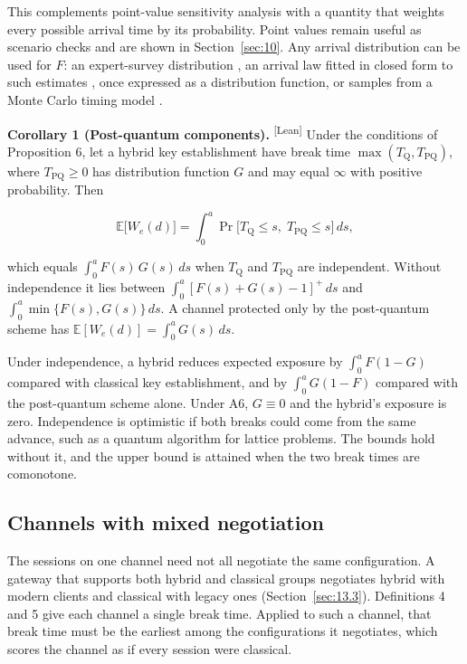 \documentclass[conference]{IEEEtran}
\newcommand{\Tq}{T_{\mathrm{Q}}}
\providecommand{\E}{}\renewcommand{\E}{\mathbb{E}}
\newcommand{\pos}[1]{\left[#1\right]^{+}}
\newcommand{\leantag}{\textsuperscript{\textsf{\scriptsize[Lean]}}}
\newenvironment{envblock}{\par\smallskip\noindent\ignorespaces}{\par\smallskip}
\begin{document}
This complements point-value sensitivity analysis with a quantity that weights every possible arrival time by its probability. Point values remain useful as scenario checks and are shown in Section~\ref{sec:10}. Any arrival distribution can be used for $F$: an expert-survey distribution \cite{mosca}, an arrival law fitted in closed form to such estimates \cite{shaw2026}, once expressed as a distribution function, or samples from a Monte Carlo timing model \cite{gupta2026}.

\begin{envblock}

\textbf{Corollary 1 (Post-quantum components).} \leantag{} Under the conditions of Proposition 6, let a hybrid key establishment have break time $\max(\Tq, T_{\mathrm{PQ}})$, where $T_{\mathrm{PQ}} \ge 0$ has distribution function $G$ and may equal $\infty$ with positive probability. Then

\[ \E\big[W_e(d)\big] = \int_0^{a} \Pr\big[\Tq \le s,\; T_{\mathrm{PQ}} \le s\big]\,ds, \]

which equals $\int_0^a F(s)\,G(s)\,ds$ when $\Tq$ and $T_{\mathrm{PQ}}$ are independent. Without independence it lies between $\int_0^a \pos{F(s) + G(s) - 1}\,ds$ and $\int_0^a \min\{F(s), G(s)\}\,ds$. A channel protected only by the post-quantum scheme has $\E[W_e(d)] = \int_0^a G(s)\,ds$.
\end{envblock}

Under independence, a hybrid reduces expected exposure by $\int_0^a F(1 - G)$ compared with classical key establishment, and by $\int_0^a G(1 - F)$ compared with the post-quantum scheme alone. Under A6, $G \equiv 0$ and the hybrid's exposure is zero. Independence is optimistic if both breaks could come from the same advance, such as a quantum algorithm for lattice problems. The bounds hold without it, and the upper bound is attained when the two break times are comonotone.

\subsection{Channels with mixed negotiation}\label{sec:6.6}

The sessions on one channel need not all negotiate the same configuration. A gateway that supports both hybrid and classical groups negotiates hybrid with modern clients and classical with legacy ones (Section~\ref{sec:13.3}). Definitions 4 and 5 give each channel a single break time. Applied to such a channel, that break time must be the earliest among the configurations it negotiates, which scores the channel as if every session were classical.
\end{document}
